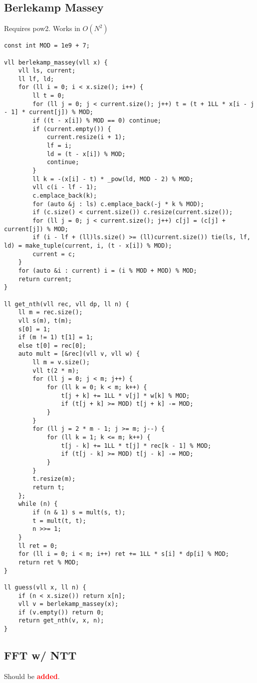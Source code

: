 \documentclass[landscape, 8pt, a4paper, oneside, twocolumn]{extarticle}
\newcommand{\added}{Should be \textcolor{red}{\textbf{added}}.}
\begin{document}
\subsection{Berlekamp Massey}
{Requires pow2. Works in $O(N^2)$}
\begin{verbatim}
const int MOD = 1e9 + 7;

vll berlekamp_massey(vll x) {
    vll ls, current;
    ll lf, ld;
    for (ll i = 0; i < x.size(); i++) {
        ll t = 0;
        for (ll j = 0; j < current.size(); j++) t = (t + 1LL * x[i - j - 1] * current[j]) % MOD;
        if ((t - x[i]) % MOD == 0) continue;
        if (current.empty()) {
            current.resize(i + 1);
            lf = i;
            ld = (t - x[i]) % MOD;
            continue;
        }
        ll k = -(x[i] - t) * _pow(ld, MOD - 2) % MOD;
        vll c(i - lf - 1);
        c.emplace_back(k);
        for (auto &j : ls) c.emplace_back(-j * k % MOD);
        if (c.size() < current.size()) c.resize(current.size());
        for (ll j = 0; j < current.size(); j++) c[j] = (c[j] + current[j]) % MOD;
        if (i - lf + (ll)ls.size() >= (ll)current.size()) tie(ls, lf, ld) = make_tuple(current, i, (t - x[i]) % MOD);
        current = c;
    }
    for (auto &i : current) i = (i % MOD + MOD) % MOD;
    return current;
}

ll get_nth(vll rec, vll dp, ll n) {
    ll m = rec.size();
    vll s(m), t(m);
    s[0] = 1;
    if (m != 1) t[1] = 1;
    else t[0] = rec[0];
    auto mult = [&rec](vll v, vll w) {
        ll m = v.size();
        vll t(2 * m);
        for (ll j = 0; j < m; j++) {
            for (ll k = 0; k < m; k++) {
                t[j + k] += 1LL * v[j] * w[k] % MOD;
                if (t[j + k] >= MOD) t[j + k] -= MOD;
            }
        }
        for (ll j = 2 * m - 1; j >= m; j--) {
            for (ll k = 1; k <= m; k++) {
                t[j - k] += 1LL * t[j] * rec[k - 1] % MOD;
                if (t[j - k] >= MOD) t[j - k] -= MOD;
            }
        }
        t.resize(m);
        return t;
    };
    while (n) {
        if (n & 1) s = mult(s, t);
        t = mult(t, t);
        n >>= 1;
    }
    ll ret = 0;
    for (ll i = 0; i < m; i++) ret += 1LL * s[i] * dp[i] % MOD;
    return ret % MOD;
}

ll guess(vll x, ll n) {
    if (n < x.size()) return x[n];
    vll v = berlekamp_massey(x);
    if (v.empty()) return 0;
    return get_nth(v, x, n);
}
\end{verbatim}

\subsection{FFT w/ NTT}
\added
\end{document}
